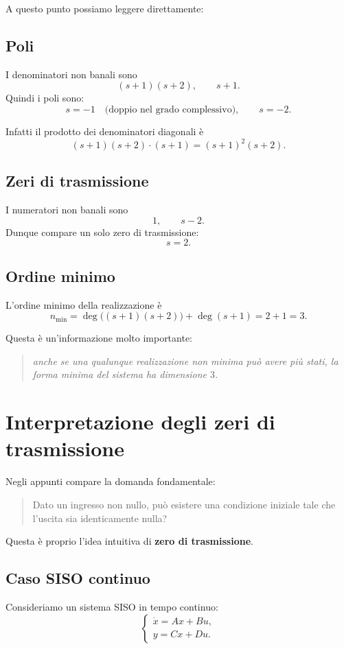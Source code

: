 A questo punto possiamo leggere direttamente:

\subsection*{Poli}
I denominatori non banali sono
\[
(s+1)(s+2),\qquad s+1.
\]
Quindi i poli sono:
\[
s=-1 \quad \text{(doppio nel grado complessivo)},\qquad s=-2.
\]

Infatti il prodotto dei denominatori diagonali è
\[
(s+1)(s+2)\cdot (s+1)=(s+1)^2(s+2).
\]

\subsection*{Zeri di trasmissione}
I numeratori non banali sono
\[
1,\qquad s-2.
\]
Dunque compare un solo zero di trasmissione:
\[
s=2.
\]

\subsection*{Ordine minimo}
L'ordine minimo della realizzazione è
\[
n_{\min}=\deg\big((s+1)(s+2)\big)+\deg(s+1)=2+1=3.
\]

Questa è un'informazione molto importante:
\begin{quote}
\emph{anche se una qualunque realizzazione non minima può avere più stati, la forma minima del sistema ha dimensione \(3\).}
\end{quote}

\bigskip

\section{Interpretazione degli zeri di trasmissione}

Negli appunti compare la domanda fondamentale:

\begin{quote}
Dato un ingresso non nullo, può esistere una condizione iniziale tale che l'uscita sia identicamente nulla?
\end{quote}

Questa è proprio l'idea intuitiva di \textbf{zero di trasmissione}.

\subsection{Caso SISO continuo}

Consideriamo un sistema SISO in tempo continuo:
\[
\begin{cases}
\dot x = Ax + Bu,\\
y = Cx + Du.
\end{cases}
\]

